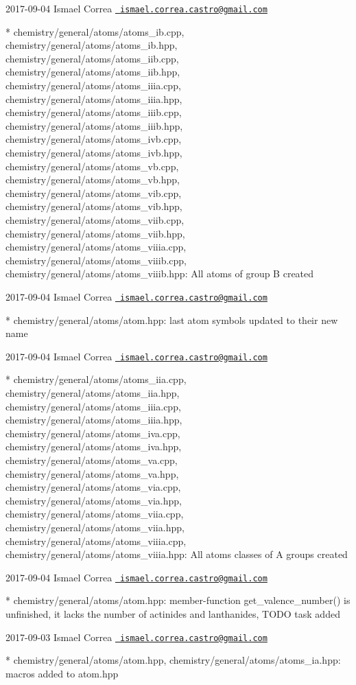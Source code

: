  2017-\/09-\/04 Ismael Correa \href{mailto:ismael.correa.castro@gmail.com}{\texttt{ ismael.\+correa.\+castro@gmail.\+com}} \begin{DoxyVerb}* chemistry/general/atoms/atoms_ib.cpp,
chemistry/general/atoms/atoms_ib.hpp,
chemistry/general/atoms/atoms_iib.cpp,
chemistry/general/atoms/atoms_iib.hpp,
chemistry/general/atoms/atoms_iiia.cpp,
chemistry/general/atoms/atoms_iiia.hpp,
chemistry/general/atoms/atoms_iiib.cpp,
chemistry/general/atoms/atoms_iiib.hpp,
chemistry/general/atoms/atoms_ivb.cpp,
chemistry/general/atoms/atoms_ivb.hpp,
chemistry/general/atoms/atoms_vb.cpp,
chemistry/general/atoms/atoms_vb.hpp,
chemistry/general/atoms/atoms_vib.cpp,
chemistry/general/atoms/atoms_vib.hpp,
chemistry/general/atoms/atoms_viib.cpp,
chemistry/general/atoms/atoms_viib.hpp,
chemistry/general/atoms/atoms_viiia.cpp,
chemistry/general/atoms/atoms_viiib.cpp,
chemistry/general/atoms/atoms_viiib.hpp: All atoms of group B
created
\end{DoxyVerb}
 2017-\/09-\/04 Ismael Correa \href{mailto:ismael.correa.castro@gmail.com}{\texttt{ ismael.\+correa.\+castro@gmail.\+com}} \begin{DoxyVerb}* chemistry/general/atoms/atom.hpp: last atom symbols updated to
their new name
\end{DoxyVerb}
 2017-\/09-\/04 Ismael Correa \href{mailto:ismael.correa.castro@gmail.com}{\texttt{ ismael.\+correa.\+castro@gmail.\+com}} \begin{DoxyVerb}* chemistry/general/atoms/atoms_iia.cpp,
chemistry/general/atoms/atoms_iia.hpp,
chemistry/general/atoms/atoms_iiia.cpp,
chemistry/general/atoms/atoms_iiia.hpp,
chemistry/general/atoms/atoms_iva.cpp,
chemistry/general/atoms/atoms_iva.hpp,
chemistry/general/atoms/atoms_va.cpp,
chemistry/general/atoms/atoms_va.hpp,
chemistry/general/atoms/atoms_via.cpp,
chemistry/general/atoms/atoms_via.hpp,
chemistry/general/atoms/atoms_viia.cpp,
chemistry/general/atoms/atoms_viia.hpp,
chemistry/general/atoms/atoms_viiia.cpp,
chemistry/general/atoms/atoms_viiia.hpp: All atoms classes of A
groups created
\end{DoxyVerb}
 2017-\/09-\/04 Ismael Correa \href{mailto:ismael.correa.castro@gmail.com}{\texttt{ ismael.\+correa.\+castro@gmail.\+com}} \begin{DoxyVerb}* chemistry/general/atoms/atom.hpp: member-function
get_valence_number() is unfinished, it lacks the number of actinides
and lanthanides, TODO task added
\end{DoxyVerb}
 2017-\/09-\/03 Ismael Correa \href{mailto:ismael.correa.castro@gmail.com}{\texttt{ ismael.\+correa.\+castro@gmail.\+com}} \begin{DoxyVerb}* chemistry/general/atoms/atom.hpp,
chemistry/general/atoms/atoms_ia.hpp: macros added to atom.hpp
\end{DoxyVerb}
